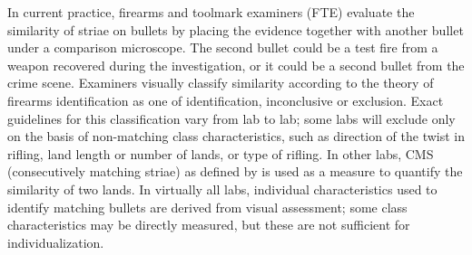 \documentclass[doubleblind]{elsarticle}\usepackage[]{graphicx}\usepackage[]{color}
\begin{document}





 
In current practice, firearms and toolmark examiners (FTE) evaluate the similarity of striae on bullets by placing the evidence together with another bullet under a comparison microscope. The second bullet could be a test fire from a weapon recovered during the investigation, or it could be a second bullet from the crime scene. Examiners visually classify similarity according to the theory of firearms identification \citep{identification} as one of identification, inconclusive or exclusion. Exact guidelines for this classification vary from lab to lab; some labs will exclude only on the basis of non-matching class characteristics, such as direction of the twist in rifling, land length or number of lands, or type of rifling. In other labs, CMS (consecutively matching striae) as defined by \citeauthor{biasotti} \citep{biasotti} is used as a measure to quantify the similarity of two lands. In virtually all labs, individual characteristics used to identify matching bullets are derived from visual assessment; some class characteristics may be directly measured, but these are not sufficient for individualization. 

\end{document}
